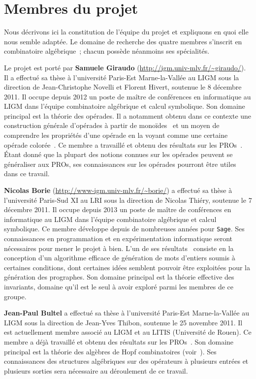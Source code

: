 \documentclass[10pt,reqno]{amsart}
\numberwithin{equation}{subsection}
\begin{document}
\section{Membres du projet}
Nous décrivons ici la constitution de l'équipe du projet et expliquons
en quoi elle nous semble adaptée. Le domaine de recherche des
quatre membres s'inscrit en combinatoire algébrique~; chacun possède
néanmoins ses spécialités.

Le projet est porté par {\bf Samuele Giraudo}
(\url{http://igm.univ-mlv.fr/~giraudo/}). Il a effectué sa thèse à
l'université Paris-Est Marne-la-Vallée au LIGM sous la direction de
Jean-Christophe Novelli et Florent Hivert, soutenue le 8 décembre 2011.
Il occupe depuis 2012 un poste de maître de conférences en informatique
au LIGM dans l'équipe combinatoire algébrique et calcul symbolique. Son
domaine principal est la théorie des opérades. Il a notamment
obtenu dans ce contexte une construction générale d'opérades à partir de
monoïdes~\cite{Gir15} et un moyen de comprendre les propriétés d'une
opérade en la voyant comme une certaine opérade colorée~\cite{CG14}. Ce
membre a travaillé et obtenu des résultats sur les PROs~\cite{BG14}.
Étant donné que la plupart des notions connues sur les opérades peuvent
se généraliser aux PROs, ses connaissances sur les opérades pourront être
utiles dans ce travail.

{\bf Nicolas Borie} (\url{http://www-igm.univ-mlv.fr/~borie/}) a effectué
sa thèse à l'université Paris-Sud XI au LRI sous la direction de Nicolas
Thiéry, soutenue le 7 décembre 2011. Il occupe depuis 2013 un poste de
maître de conférences en informatique au LIGM dans l'équipe combinatoire
algébrique et calcul symbolique. Ce membre développe depuis de nombreuses
années pour \texttt{Sage}. Ses connaissances en programmation et en
expérimentation informatique seront nécessaires pour mener le projet à
bien. L'un de ses résultats~\cite{Bor13} consiste en la conception d'un
algorithme efficace de génération de mots d'entiers soumis à certaines
conditions, dont certaines idées semblent pouvoir être exploitées pour
la génération des prographes. Son domaine principal est la théorie
effective des invariants, domaine qu'il est le seul à avoir exploré
parmi les membres de ce groupe.

{\bf Jean-Paul Bultel} a effectué sa thèse à l'université Paris-Est
Marne-la-Vallée au LIGM sous la direction de Jean-Yves Thibon, soutenue
le 25 novembre 2011. Il est actuellement membre associé au LIGM et au
LITIS (Université de Rouen). Ce membre a déjà travaillé et obtenu des
résultats sur les PROs~\cite{BG14}. Son domaine principal est la théorie
des algèbres de Hopf combinatoires (voir~\cite{Bul11}). Ses connaissances
des structures algébriques sur des opérateurs à plusieurs entrées et
plusieurs sorties sera nécessaire au déroulement de ce travail.
\end{document}
